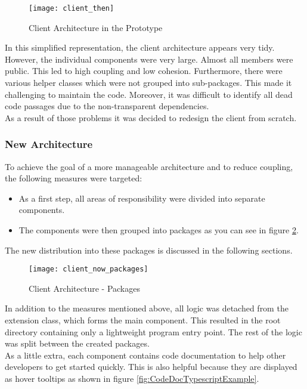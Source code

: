 \begin{figure}[H]
    \centering
    \texttt{[image: client\_then]}
    \caption{Client Architecture in the Prototype}
    \label{fig:client_then}
\end{figure}

In this simplified representation, the client architecture appears very tidy.
However, the individual components were very large.
Almost all members were public.
This led to high coupling and low cohesion.
Furthermore, there were various helper classes which were not grouped into sub-packages.
This made it challenging to maintain the code.
Moreover, it was difficult to identify all dead code passages due to the non-transparent dependencies.\\

As a result of those problems it was decided to redesign the client from scratch.

\subsubsection{New Architecture}
To achieve the goal of a more manageable architecture and to reduce coupling, the following measures were targeted:
\begin{itemize}
    \item As a first step, all areas of responsibility were divided into separate components.
    \item The components were then grouped into packages as you can see in figure \ref{fig:client_now_packages}.
\end{itemize}
The new distribution into these packages is discussed in the following sections.\\

\begin{figure}[H]
    \centering
    \texttt{[image: client\_now\_packages]}
    \caption{Client Architecture - Packages}
    \label{fig:client_now_packages}
\end{figure}

In addition to the measures mentioned above, all logic was detached from the extension class, which forms the main component.
This resulted in the root directory containing only a lightweight program entry point.
The rest of the logic was split between the created packages.\\

As a little extra, each component contains code documentation to help other developers to get started quickly.
This is also helpful because they are displayed as hover tooltips as shown in figure \ref{fig:CodeDocTypescriptExample}.

